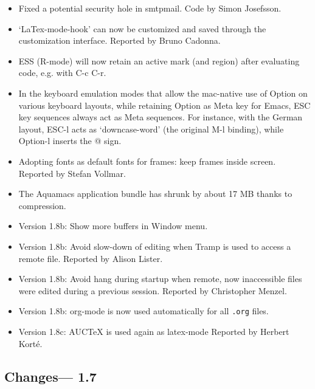 \begin{itemize}
\item Fixed a potential security hole in smtpmail.
Code by Simon Josefsson.

\item `LaTex-mode-hook' can now be customized and saved through the
  customization interface.
Reported by Bruno Cadonna.

\item ESS (R-mode) will now retain an active mark (and region) after evaluating code, e.g. with C-c C-r.  

\item In the keyboard emulation modes that allow the mac-native use of Option on various keyboard layouts, while retaining Option as Meta key for Emacs, ESC key sequences always act as Meta sequences.  For instance, with the German layout, ESC-l  acts as `downcase-word' (the original M-l binding), while Option-l inserts the @ sign.

\item Adopting fonts as default fonts for frames: keep frames inside screen.
Reported by Stefan Vollmar.

\item The Aquamacs application bundle has shrunk by about 17 MB thanks to compression.

\item Version 1.8b: Show more buffers in Window menu.

\item Version 1.8b: Avoid slow-down of editing when Tramp is used to access a remote file.
Reported by Alison Lister.

\item Version 1.8b: Avoid hang during startup when remote, now inaccessible files were edited during a previous session.
Reported by Christopher Menzel.

\item Version 1.8b: org-mode is now used automatically for all {\tt .org} files.

\item Version 1.8c: AUCTeX is used again as latex-mode
Reported by Herbert Korté.
\end{itemize}


\subsection{Changes--- 1.7}

